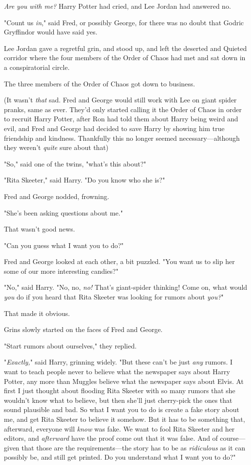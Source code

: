 \emph{Are you with me?} Harry Potter had cried, and Lee Jordan had answered no.

"Count us \emph{in}," said Fred, or possibly George, for there was no doubt
that Godric Gryffindor would have said yes.

Lee Jordan gave a regretful grin, and stood up, and left the deserted and
Quieted corridor where the four members of the Order of Chaos had met and sat
down in a conspiratorial \mbox{circle}.

The three members of the Order of Chaos got down to business.

(It wasn't \emph{that} sad. Fred and George would still work with Lee on giant
spider pranks, same as ever. They'd only started calling it the Order of Chaos
in order to recruit Harry Potter, after Ron had told them about Harry being
weird and evil, and Fred and George had decided to save Harry by showing him
true friendship and kindness. Thankfully this no longer seemed
necessary---although they weren't \emph{quite} sure about that{\el})

"So," said one of the twins, "what's this about?"

"Rita Skeeter," said Harry. "Do you know who she is?"

Fred and George nodded, frowning.

"She's been asking questions about me."

That wasn't good news.

"Can you guess what I want you to do?"

Fred and George looked at each other, a bit puzzled. "You want us to slip her
some of our more interesting candies?"

"No," said Harry. "No, no, \emph{no!} That's giant-spider thinking! Come on,
what would \emph{you} do if you heard that Rita Skeeter was looking for rumors
about \emph{you?}"

That made it obvious.

Grins slowly started on the faces of Fred and George.

"Start rumors about ourselves," they replied.

"\emph{Exactly,}" said Harry, grinning widely. "But these can't be just
\emph{any} rumors. I want to teach people never to believe what the newspaper
says about Harry Potter, any more than Muggles believe what the newspaper says
about Elvis. At first I just thought about flooding Rita Skeeter with so many
rumors that she wouldn't know what to believe, but then she'll just cherry-pick
the ones that sound plausible and bad. So what I want you to do is create a
fake story about me, and get Rita Skeeter to believe it somehow. But it has to
be something that, afterward, everyone will \emph{know} was fake. We want to
fool Rita Skeeter and her editors, and \emph{afterward} have the proof come out
that it was false. And of course---given that those are the requirements---the
story has to be as \emph{ridiculous} as it can possibly be, and still get
printed. Do you understand what I want you to do?"

